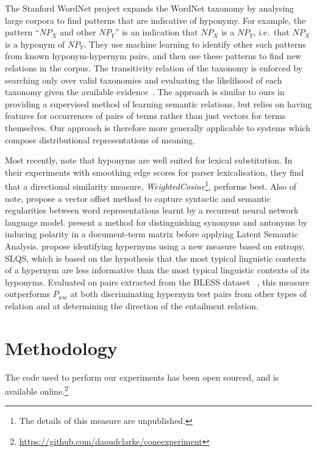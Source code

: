 \documentclass[11pt]{article}
\begin{document}
The Stanford WordNet project \cite{Snow:04} expands the WordNet
taxonomy by analysing large corpora to find patterns that are
indicative of hyponymy. For example, the pattern ``$\mathit{NP}_X$ and
other $\mathit{NP}_Y$'' is an indication that $\mathit{NP}_X$ is a
$\mathit{NP}_Y$, i.e.~that $\mathit{NP}_X$ is a hyponym of
$\mathit{NP}_Y$. They use machine learning to identify other such
patterns from known hyponym-hypernym pairs, and then use these
patterns to find new relations in the corpus. The
transitivity relation of the taxonomy is enforced by searching only over valid
taxonomies and evaluating the likelihood of each taxonomy given the
available evidence~\cite{Snow:06}. The approach is similar to
ours in providing a supervised method of learning semantic relations, but relies on having features for occurrences of pairs of terms rather than just vectors for terms themselves. Our approach is therefore more generally applicable to systems which compose distributional
representations of meaning.

Most recently,  note that hyponyms are well suited for lexical substitution.  In their experiments with smoothing edge scores for parser lexicalisation, they find that a directional similarity measure,  \emph{WeightedCosine}\footnote{The details of this measure are unpublished.}, performs best.  Also of note,  propose a vector offset method to capture syntactic and semantic regularities between word representations learnt by a recurrent neural network language model.   present a method for distinguishing synonyms and antonyms by inducing polarity in a document-term matrix before applying Latent Semantic Analysis.   propose identifying hypernyms using a new measure based on entropy, SLQS, which is based on the hypothesis that the most typical linguistic contexts of a hypernym are less informative than the most typical linguistic contexts of its hyponyms.  Evaluated on pairs extracted from the BLESS dataset ~\cite{Baroni2011}, this measure outperforms $P_{ww}$ at both discriminating hypernym test pairs from other types of relation and at determining the direction of the entailment relation.


\section{Methodology}

The code used to perform our experiments has been open sourced, and is
available online.\footnote{\url{https://github.com/daoudclarke/coneexperiment}}
\end{document}
